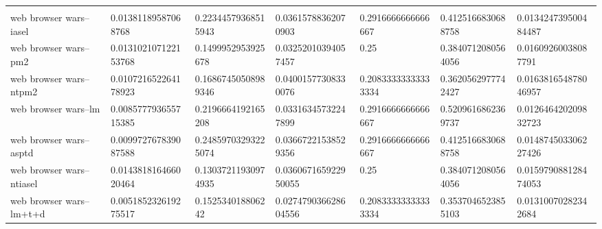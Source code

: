 \begin{table}[h]
\begin{tabular}{lllllll}
                                      &                       &                     &                      &                     &                     &                       \\
web browser wars--iasel               & 0.01381189587068768   & 0.22344579368515943 & 0.03615788362070903  & 0.2916666666666667  & 0.4125166830688758  & 0.013424739500484487  \\
web browser wars--pm2                 & 0.013102107122153768  & 0.1499952953925678  & 0.03252010394057457  & 0.25                & 0.3840712080564056  & 0.01609260038087791   \\
web browser wars--ntpm2               & 0.010721652264178923  & 0.16867450508989346 & 0.04001577308330076  & 0.20833333333333334 & 0.3620562977742427  & 0.016381654878046957  \\
web browser wars--lm                  & 0.008577793655715385  & 0.2196664192165208  & 0.03316345732247899  & 0.2916666666666667  & 0.5209616862369737  & 0.012646420209832723  \\
web browser wars--asptd               & 0.009972767839087588  & 0.24859703293225074 & 0.03667221538529356  & 0.2916666666666667  & 0.4125166830688758  & 0.014874503306227426  \\
web browser wars--ntiasel             & 0.014381816466020464  & 0.13037211930974935 & 0.036067165922950055 & 0.25                & 0.3840712080564056  & 0.015979088128474053  \\
web browser wars--lm+t+d              & 0.005185232619275517  & 0.152534018806242   & 0.027479036628604556 & 0.20833333333333334 & 0.3537046523855103  & 0.01310070282342684  
\end{tabular}
\end{table}